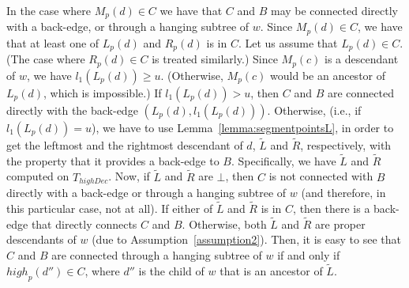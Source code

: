 \documentclass[11pt,a4paper]{article}
\begin{document}
\begin{comment}
Now we have two cases to consider: either we have established that $C$ is connected with $B$ with the above test, or the above test has failed to establish the connection of $C$ and $B$. (Notice that the second case implies that, indeed, $C$ and $B$ are disconnected, because there is no other way in which they might be connected.) In either case, we work in the same way, and it is sufficient to check whether $T(d')$ (and therefore $A$) is connected with either $C$ or $B$. Notice that $T(d')$ is connected with $C$ if and only if $\mathit{high}_p(d')\in C$. If this is not true, then we have that $\mathit{high}_p(d')=\bot$ or $\mathit{high}_p(d')\leq v$. If $\mathit{high}_p(d')=\bot$, then $A$ is isolated from $B$ and $C$. Otherwise, we have that $T(d')$ is connected with $B$ if and only if either $\mathit{high}^p_1(d')\in B$ or $\mathit{high}^p_2(d')\in B$. Otherwise, we conclude that $A$ is isolated from $C$ and $B$.
\end{comment}

In the case where $M_p(d)\in C$ we have that $C$ and $B$ may be connected directly with a back-edge, or through a hanging subtree of $w$. Since $M_p(d)\in C$, we have that at least one of $L_p(d)$ and $R_p(d)$ is in $C$. Let us assume that $L_p(d)\in C$. (The case where $R_p(d)\in C$ is treated similarly.) Since $M_p(c)$ is a descendant of $w$, we have $l_1(L_p(d))\geq u$. (Otherwise, $M_p(c)$ would be an ancestor of $L_p(d)$, which is impossible.) If $l_1(L_p(d))>u$, then $C$ and $B$ are connected directly with the back-edge $(L_p(d),l_1(L_p(d)))$. Otherwise, (i.e., if $l_1(L_p(d))=u$), we have to use  Lemma~\ref{lemma:segmentpointsL}, in order to get the leftmost and the rightmost descendant of $d$, $\widetilde{L}$ and $\widetilde{R}$, respectively, with the property that it provides a back-edge to $B$. Specifically, we have $\widetilde{L}$ and $\widetilde{R}$  computed on $T_\mathit{highDec}$. Now, if $\widetilde{L}$ and $\widetilde{R}$ are $\bot$, then $C$ is not connected with $B$ directly with a back-edge or through a hanging subtree of $w$ (and therefore, in this particular case, not at all). If either of $\widetilde{L}$ and $\widetilde{R}$ is in $C$, then there is a back-edge that directly connects $C$ and $B$. Otherwise, both $\widetilde{L}$ and $\widetilde{R}$ are proper descendants of $w$ (due to Assumption~\ref{assumption2}). Then, it is easy to see that $C$ and $B$ are connected through a hanging subtree of $w$ if and only if $\mathit{high}_p(d'')\in C$, where $d''$ is the child of $w$ that is an ancestor of $\widetilde{L}$. 
\end{document}
